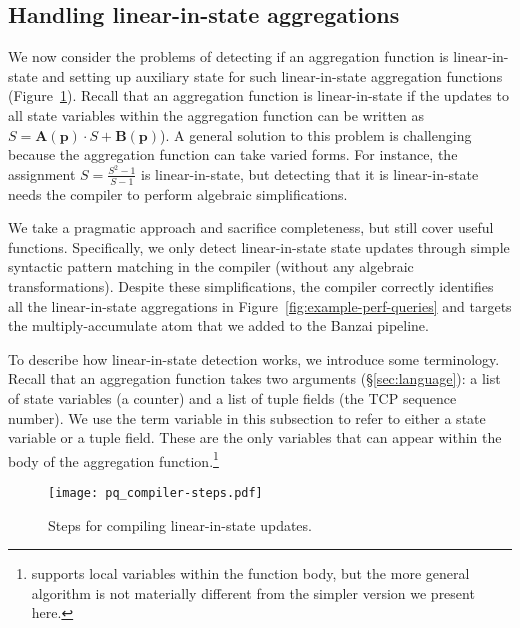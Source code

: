 \subsection{Handling linear-in-state aggregations}
\label{sec:linear-in-state-compilation}

We now consider the problems of detecting if an aggregation function is
linear-in-state and setting up auxiliary state for such linear-in-state
aggregation functions (Figure~\ref{fig:compiler-steps}). Recall that an
aggregation function is linear-in-state if the updates to all state variables
within the aggregation function can be written as $S =
\boldsymbol{A}(\mathbf{p}) \cdot S + \boldsymbol{B}(\mathbf{p})$).  A general
solution to this problem is challenging because the aggregation function can
take varied forms. For instance, the assignment $S = \frac{S^2 - 1}{S -1}$ is
linear-in-state, but detecting that it is linear-in-state needs the compiler to
perform algebraic simplifications.

We take a pragmatic approach and sacrifice completeness, but still cover useful
functions. Specifically, we only detect linear-in-state state updates through
simple syntactic pattern matching in the compiler (\ie without any algebraic
transformations).  Despite these simplifications, the \TheSystem compiler
correctly identifies all the linear-in-state aggregations in
Figure~\ref{fig:example-perf-queries} and targets the multiply-accumulate atom
that we added to the Banzai pipeline.

To describe how linear-in-state detection works, we introduce some terminology.
Recall that an aggregation function takes two arguments (\S\ref{sec:language}):
a list of state variables (\eg a counter) and a list of tuple fields (\eg the
TCP sequence number). We use the term variable in this subsection to refer to
either a state variable or a tuple field. These are the only variables that can
appear within the body of the aggregation function.\footnote{\TheSystem
supports local variables within the function body, but the more general
algorithm is not materially different from the simpler version we present
here.}

\begin{figure}
\centering
\texttt{[image: pq\_compiler-steps.pdf]}
\caption{Steps for compiling linear-in-state updates.}
\label{fig:compiler-steps}
\end{figure}

